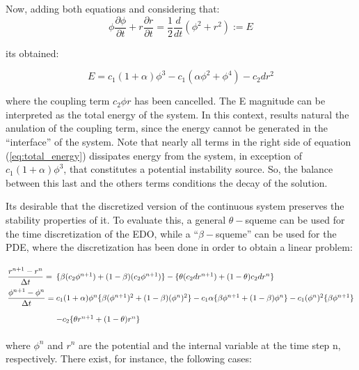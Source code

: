 Now, adding both equations and considering that:
\begin{equation*}
\phi \dfrac{\partial \phi}{ \partial t} + r \dfrac{\partial r}{\partial t} = \frac{1}{2} \frac{d}{dt} \left(\phi^2 + r^2 \right):= E
\end{equation*}

\noindent its obtained:

\begin{equation}
E = c_1 (1 + \alpha) \phi^3 - c_1 (\alpha \phi^2 +  \phi^4) -c_2 d r^2 \label{eq:total_energy}
\end{equation}

\noindent where the coupling term $c_2 \phi r$ has been cancelled. The E magnitude can be interpreted as the total energy of the system. In this context, results natural the anulation of the coupling term, since the energy cannot be generated in the ``interface'' of the system. Note that nearly all terms in the right side of equation (\ref{eq:total_energy}) dissipates energy from the system, in exception of $c_1 (1 + \alpha) \phi^3$, that constitutes a potential instability source. So, the balance between this last and the others terms conditions the decay of the solution.

Its desirable that the discretized version of the continuous system preserves the stability properties of it. To evaluate this, a general $\theta-$squeme can be used for the time discretization of the EDO, while a ``$\beta-$squeme'' can be used for the PDE, where the discretization has been done in order to obtain a linear problem:

\begin{equation}
\arraycolsep=1.4pt\def\arraystretch{2.2}
\begin{array}{llr}
\dfrac{r^{n+1}-r^n}{\Delta t} 
= &\{ \beta (c_2 \phi^{n + 1}) + (1 - \beta  )(c_2 \phi^{n + 1}) \} 
- \{ \theta  (c_2 d r^{n + 1}) + (1 - \theta )c_2 d r^{n} \} \\

\dfrac{\phi^{n+1} - \phi^n}{\Delta t}
= &c_1(1 + \alpha)\phi^n \{ \beta (\phi^{n+1})^2 + (1 - \beta) (\phi^{n})^2 \} 
- c_1 \alpha \{ \beta \phi^{n+1}  + (1 - \beta) \phi^n \} 
- c_1 (\phi^n)^2 \{ \beta \phi^{n+1} \} \\
 &- c_2 \{\theta r^{n+1} + (1 - \theta) r^{n} \}
\end{array} \label{eq:teta_esquema_MDE}
\end{equation}

\noindent where $\phi^{n}$ and $r^{n}$ are the potential and the internal variable at the time step n, respectively. There exist, for instance, the following cases:

